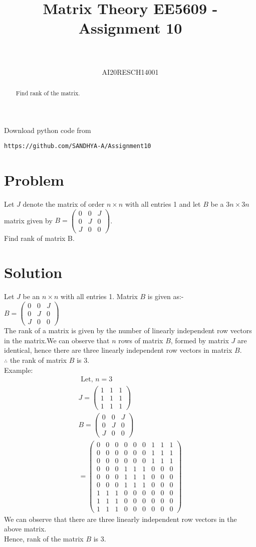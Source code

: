 \documentclass[journal,12pt,twocolumn]{IEEEtran}
\numberwithin{equation}{subsection}
\newcommand{\myvec}[1]{\ensuremath{\begin{pmatrix}#1\end{pmatrix}}}
\begin{document}
\title{Matrix Theory EE5609 - Assignment 10\\
}

\author{\\
 \\
AI20RESCH14001\\
 }

\maketitle
\begin{abstract}
Find rank of the matrix.
\end{abstract}
Download  python code from 
\begin{lstlisting}
https://github.com/SANDHYA-A/Assignment10
\end{lstlisting}
\section{Problem}
Let $J$ denote the matrix of order $n \times n$ with all
entries 1 and let $B$ be a $3n \times 3n$ matrix given by
$B = \myvec{0&0&J\\0&J&0\\J&0&0}$. \\
Find rank of matrix B.
\section{Solution}
Let $J$ be an $ n \times n$ with all entries 1. Matrix $B$ is given as:-\\
$B = \myvec{0&0&J\\0&J&0\\J&0&0}$\\
The rank of a matrix is given by the number of linearly independent row vectors in the matrix.We can observe that $n$ rows of matrix $B$, formed by matrix $J$ are identical, hence there are three linearly independent row vectors in matrix $B$. \\
$\therefore$ the rank of matrix $B$ is 3.\\
Example: 
\begin{align}
\text{ Let, } n =3\\
J = \myvec{1&1&1\\1&1&1\\1&1&1}\\
B=\myvec{0&0&J\\0&J&0\\J&0&0}\\
=\myvec{0&0&0&0&0&0&1&1&1\\0&0&0&0&0&0&1&1&1\\0&0&0&0&0&0&1&1&1\\0&0&0&1&1&1&0&0&0\\0&0&0&1&1&1&0&0&0\\0&0&0&1&1&1&0&0&0\\1&1&1&0&0&0&0&0&0\\1&1&1&0&0&0&0&0&0\\1&1&1&0&0&0&0&0&0}
\end{align}
We can observe that there are three linearly independent row vectors in the above matrix.\\
Hence, rank of the matrix $B$ is 3.
\end{document}
